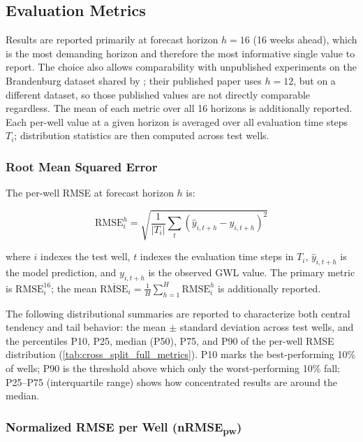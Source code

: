 \subsection{Evaluation Metrics}
\label{subsec:metrics}

Results are reported primarily at forecast horizon $h = 16$ (16 weeks ahead), which is the most demanding horizon and therefore the most informative single value to report. The choice also allows comparability with unpublished experiments on the Brandenburg dataset shared by \citeauthor{kunz2025}; their published paper uses $h = 12$, but on a different dataset, so those published values are not directly comparable regardless. The mean of each metric over all 16 horizons is additionally reported. Each per-well value at a given horizon is averaged over all evaluation time steps $T_i$; distribution statistics are then computed across test wells.

\subsubsection{Root Mean Squared Error}

The per-well RMSE at forecast horizon $h$ is:

\begin{equation}
  \text{RMSE}_i^h = \sqrt{\frac{1}{|T_i|} \sum_{t} \left(\hat{y}_{i,t+h} - y_{i,t+h}\right)^2}
  \label{eq:rmse}
\end{equation}

where $i$ indexes the test well, $t$ indexes the evaluation time steps in $T_i$, $\hat{y}_{i,t+h}$ is the model prediction, and $y_{i,t+h}$ is the observed GWL value. The primary metric is $\text{RMSE}_i^{16}$; the mean $\overline{\text{RMSE}}_i = \frac{1}{H}\sum_{h=1}^{H} \text{RMSE}_i^h$ is additionally reported.

The following distributional summaries are reported to characterize both central tendency and
tail behavior: the mean $\pm$ standard deviation across test wells, and the percentiles
P10, P25, median (P50), P75, and P90 of the per-well RMSE distribution (\cref{tab:cross_split_full_metrics}). P10 marks the best-performing 10\% of wells; P90 is the threshold above which only the worst-performing 10\% fall; P25--P75 (interquartile range) shows how concentrated results are around the median.

\subsubsection{Normalized RMSE per Well (nRMSE\textsubscript{pw})}

